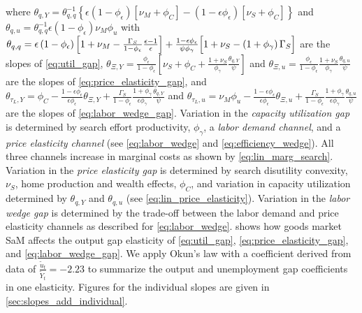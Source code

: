 \documentclass[12pt,3p,authoryear,review]{elsarticle}
\begin{document}
where $\theta_{q,Y} = \theta_{q,q}^{-1} \left\{\epsilon\left(1-\phi_\epsilon\right)\left[\nu_M+\phi_C\right]-\left(1-\epsilon\phi_\epsilon\right)\left[\nu_S+\phi_C\right]\right\}$ and $\theta_{q,u} = \theta_{q,q}^{-1} \epsilon\left(1-\phi_\epsilon\right)\nu_M \phi_u$ with $\theta_{q,q} = \epsilon\left(1-\phi_\epsilon\right)\Bigl[1+\nu_M-\frac{\Gamma_S}{1-\phi_\epsilon}\frac{\epsilon-1}{\epsilon}\Bigr]+\frac{1-\epsilon\phi_\epsilon}{\psi\phi_\gamma}\Bigl[1+\nu_S-\left(1+\phi_\gamma\right)\Gamma_S\Bigr]$ are the slopes of \eqref{eq:util_gap}, $\theta_{\Xi,Y} = \frac{\phi_\epsilon}{1-\phi_\epsilon} \left[ \nu_S + \phi_C + \frac{1+\nu_S}{\phi_\gamma} \frac{\theta_{q,Y}}{\psi} \right]$ and $\theta_{\Xi,u} = \frac{\phi_\epsilon}{1-\phi_\epsilon} \frac{1+\nu_S}{\phi_\gamma} \frac{\theta_{q,u}}{\psi}$ are the slopes of \eqref{eq:price_elasticity_gap}, and $\theta_{\tau_L,Y} = \phi_C - \frac{1-\epsilon\phi_\epsilon}{\epsilon \phi_\epsilon} \theta_{\Xi,Y} + \frac{\Gamma_S}{1-\phi_\epsilon}\frac{1+\phi_\gamma}{\epsilon\phi_\gamma} \frac{\theta_{q,Y}}{\psi}$ and $\theta_{\tau_L,u} = \nu_M \phi_u - \frac{1-\epsilon\phi_\epsilon}{\epsilon\phi_\epsilon} \theta_{\Xi,u} + \frac{\Gamma_S}{1-\phi_\epsilon}\frac{1+\phi_\gamma}{\epsilon\phi_\gamma}\frac{\theta_{q,u}}{\psi}$ are the slopes of \eqref{eq:labor_wedge_gap}. Variation in the \emph{capacity utilization gap} is determined by search effort productivity, $\phi_\gamma$, a \emph{labor demand channel}, and a \emph{price elasticity channel} (see \eqref{eq:labor_wedge} and \eqref{eq:efficiency_wedge}). All three channels increase in marginal costs as shown by \eqref{eq:lin_marg_search}. Variation in the \emph{price elasticity gap} is determined by search disutility convexity, $\nu_S$, home production and wealth effects, $\phi_C$, and variation in capacity utilization determined by $\theta_{q,Y}$ and $\theta_{q,u}$ (see \eqref{eq:lin_price_elasticity}). Variation in the \emph{labor wedge gap} is determined by the trade-off between the labor demand and price elasticity channels as described for \eqref{eq:labor_wedge}.  shows how goods market SaM affects the output gap elasticity of \eqref{eq:util_gap}, \eqref{eq:price_elasticity_gap}, and \eqref{eq:labor_wedge_gap}. We apply Okun's law with a coefficient derived from data of $\frac{\tilde{u}_t}{\tilde{Y}_t} = -2.23$ \citep{knotek2007useful} to summarize the output and unemployment gap coefficients in one elasticity. Figures for the individual slopes are given in \ref{sec:slopes_add_individual}.%
\end{document}
